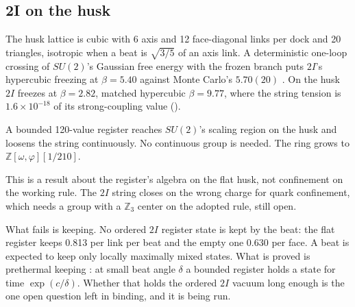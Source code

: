 \subsection{2I on the husk}

The husk lattice is cubic with 6 axis and 12 face-diagonal links per dock and 20 triangles, isotropic when a beat is
$\sqrt{3/5}$ of an axis link. A deterministic one-loop crossing of $SU(2)$'s Gaussian free energy with the frozen branch
puts $2I$'s hypercubic freezing at $\beta = 5.40$ against Monte Carlo's $5.70(20)$ \cite{hartung2022}. On the husk
$2I$ freezes at $\beta = 2.82$, matched hypercubic $\beta = 9.77$, where the string tension is $1.6 \times 10^{-18}$ of
its strong-coupling value ().

\begin{result}
A bounded 120-value register reaches $SU(2)$'s scaling region on the husk and loosens the string continuously. No
continuous group is needed. The ring grows to $\mathbb{Z}[\omega, \varphi][1/210]$.
\end{result}

This is a result about the register's algebra on the flat husk, not confinement on the working rule. The $2I$ string
closes on the wrong charge for quark confinement, which needs a group with a $\mathbb{Z}_3$ center on the adopted rule,
still open.

What fails is keeping. No ordered $2I$ register state is kept by the beat: the flat register keeps 0.813 per link per
beat and the empty one 0.630 per face. A beat is expected to keep only locally maximally mixed states. What is proved
is prethermal keeping \cite{abanin2017}: at small beat angle $\delta$ a bounded register holds a state for time
$\exp(c/\delta)$. Whether that holds the ordered $2I$ vacuum long enough is the one open question left in binding, and
it is being run.
